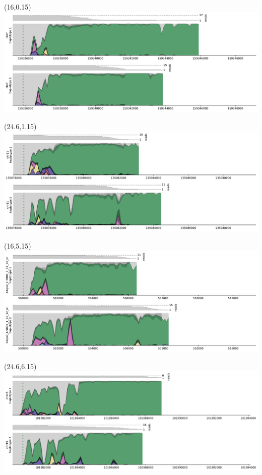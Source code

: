 \documentclass{article}
\begin{document}
\begin{textblock}{1}(16,0.15)   \includegraphics[width=11in]{main-figure-assets/densityplots/chr7-haps.pdf}                     \end{textblock}
\begin{textblock}{1}(24.6,1.15) \includegraphics[width=11in]{main-figure-assets/densityplots/chr11-haps.pdf}                    \end{textblock}
\begin{textblock}{1}(16,5.15)   \includegraphics[width=11in]{main-figure-assets/densityplots/14qtel_1-500K_1_12_12_rc-haps.pdf} \end{textblock}
\begin{textblock}{1}(24.6,6.15) \includegraphics[width=11in]{main-figure-assets/densityplots/chr15-haps.pdf}                    \end{textblock}
\end{document}
